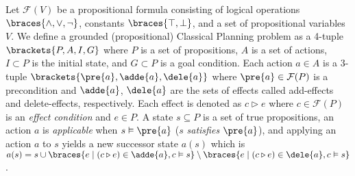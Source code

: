 Let $\mathcal{F}(V)$ be a propositional formula consisting of
 logical operations $\braces{\land,\lor,\lnot}$,
 constants $\braces{\top,\bot}$, and
 a set of propositional variables $V$.
We define a grounded (propositional) Classical Planning problem
as a 4-tuple $\brackets{P,A,I,G}$
where
 $P$ is a set of propositions,
 $A$ is a set of actions,
 $I\subset P$ is the initial state, and
 $G\subset P$ is a goal condition.
Each action $a\in A$ is a 3-tuple $\brackets{\pre{a},\adde{a},\dele{a}}$ where
 $\pre{a} \in \mathcal{F}(P)$ is a precondition and
 $\adde{a}$, $\dele{a}$ are the sets of effects called add-effects and delete-effects, respectively.
Each effect is denoted as $c \triangleright e$ where
 $c \in \mathcal{F}(P)$ is an \emph{effect condition} and
 $e \in P$.
A state $s\subseteq P$ is a set of true propositions,
an action $a$ is \emph{applicable} when $s \vDash \pre{a}$ ($s$ \emph{satisfies} $\pre{a}$),
and applying an action $a$ to $s$ yields a new successor state $a(s)$ which is
$a(s) = s \cup \braces{e \mid (c \triangleright e) \in \adde{a}, c\vDash s} \setminus \braces{e \mid (c \triangleright e) \in \dele{a}, c\vDash s}$.
